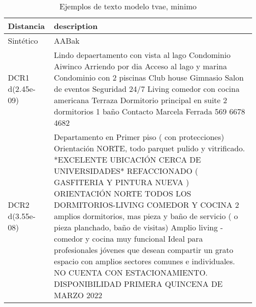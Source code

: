 \begin{table}[H]
\centering
\fontsize{10}{14}\selectfont
\caption{Ejemplos de texto modelo tvae, minimo}
\label{table-example-economicos-a-1-tvae-min-text}
\begin{tabular}{|l|m{35em}|}
\hline
\rowcolor[gray]{0.8}
Distancia & description \\
\hline Sintético & AABak \\
\hline DCR1 d(2.45e-09) & Lindo depaertamento con vista al lago Condominio Aiwinco Arriendo por dia  Acceso al lago y marina   Condominio con 2 piscinas Club house Gimnasio Salon de eventos Seguridad 24/7  Living comedor con cocina americana Terraza Dormitorio principal en suite 2 dormitorios  1 ba\~no  Contacto Marcela Ferrada 569 6678 4682 \\
\hline DCR2 d(3.55e-08) & Departamento en Primer piso ( con protecciones) Orientaci\'on NORTE, todo parquet pulido y vitrificado. *EXCELENTE UBICACI\'ON CERCA DE UNIVERSIDADES* REFACCIONADO ( GASFITERIA Y PINTURA NUEVA ) ORIENTACI\'ON NORTE TODOS LOS DORMITORIOS-LIVING COMEDOR Y COCINA 2 amplios dormitorios, mas pieza y ba\~no de servicio ( o pieza planchado, ba\~no de visitas) Amplio living - comedor y cocina muy funcional Ideal para profesionales j\'ovenes que desean compartir un grato espacio con amplios sectores comunes e individuales. NO CUENTA CON ESTACIONAMIENTO. DISPONIBILIDAD PRIMERA QUINCENA DE MARZO 2022 \\
\hline
\end{tabular}
\end{table}
